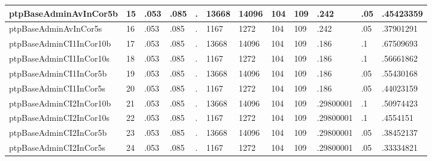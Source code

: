 \begin{table}[htbp]
\begin{tabular}{|l|l|l|l|l|l|l|l|l|l|l|l|}
ptpBaseAdminAvInCor5b & 15 & .053 & .085 & . & 13668 & 14096 & 104 & 109 & .242 & .05 & .45423359 \\ \hline 
ptpBaseAdminAvInCor5s & 16 & .053 & .085 & . & 1167 & 1272 & 104 & 109 & .242 & .05 & .37901291 \\ \hline 
ptpBaseAdminCI1InCor10b & 17 & .053 & .085 & . & 13668 & 14096 & 104 & 109 & .186 & .1 & .67509693 \\ \hline 
ptpBaseAdminCI1InCor10s & 18 & .053 & .085 & . & 1167 & 1272 & 104 & 109 & .186 & .1 & .56661862 \\ \hline 
ptpBaseAdminCI1InCor5b & 19 & .053 & .085 & . & 13668 & 14096 & 104 & 109 & .186 & .05 & .55430168 \\ \hline 
ptpBaseAdminCI1InCor5s & 20 & .053 & .085 & . & 1167 & 1272 & 104 & 109 & .186 & .05 & .44023159 \\ \hline 
ptpBaseAdminCI2InCor10b & 21 & .053 & .085 & . & 13668 & 14096 & 104 & 109 & .29800001 & .1 & .50974423 \\ \hline 
ptpBaseAdminCI2InCor10s & 22 & .053 & .085 & . & 1167 & 1272 & 104 & 109 & .29800001 & .1 & .4554151 \\ \hline 
ptpBaseAdminCI2InCor5b & 23 & .053 & .085 & . & 13668 & 14096 & 104 & 109 & .29800001 & .05 & .38452137 \\ \hline 
ptpBaseAdminCI2InCor5s & 24 & .053 & .085 & . & 1167 & 1272 & 104 & 109 & .29800001 & .05 & .33334821 \\ \hline 
  \end{tabular}
\end{table}
